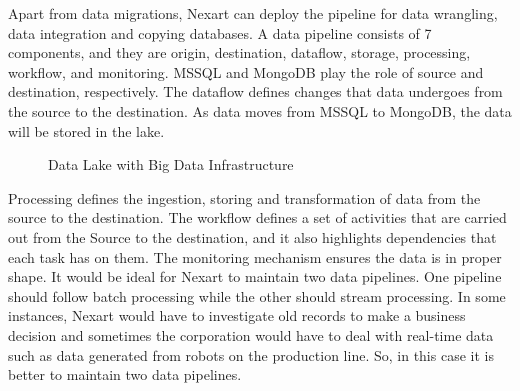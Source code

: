 \documentclass[a4Paper,12pt]{report}
\begin{document}
Apart from data migrations, Nexart can deploy the pipeline for data wrangling, data integration and copying databases. A data pipeline consists of 7 components, and they are origin, destination, dataflow, storage, processing, workflow, and monitoring. MSSQL and MongoDB play the role of source and destination, respectively. The dataflow defines changes that data undergoes from the source to the destination. As data moves from MSSQL to MongoDB, the data will be stored in the lake.
\begin{figure}[H]
\centering
{}
\caption{Data Lake with Big Data Infrastructure}
\end{figure}
Processing defines the ingestion, storing and transformation of data from the source to the destination. The workflow defines a set of activities that are carried out from the Source to the destination, and it also highlights dependencies that each task has on them. The monitoring mechanism ensures the data is in proper shape. It would be ideal for Nexart to maintain two data pipelines. One pipeline should follow batch processing while the other should stream processing. In some instances, Nexart would have to investigate old records to make a business decision and sometimes the corporation would have to deal with real-time data such as data generated from robots on the production line. So, in this case it is better to maintain two data pipelines. \\[12pt]
\end{document}
